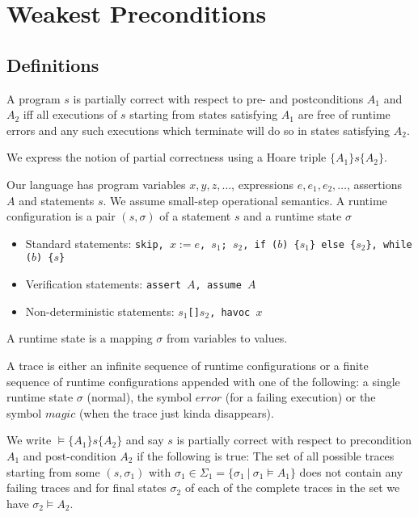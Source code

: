 \section{Weakest Preconditions}
\subsection{Definitions}
\begin{mytitle} A program $s$ is partially correct with respect to pre- and postconditions $A_1$ and $A_2$ iff all executions of $s$ starting from states satisfying $A_1$ are free of runtime errors and any such executions which terminate will do so in states satisfying $A_2$.
\end{mytitle}
\begin{mytitle} We express the notion of partial correctness using a Hoare triple $\{A_1\}s\{A_2\}$.
\end{mytitle}
\begin{mytitle} Our language has program variables $x, y, z, \ldots$, expressions $e, e_1, e_2, \ldots$, assertions $A$ and statements $s$. We assume small-step operational semantics. A runtime configuration is a pair $(s, \sigma)$ of a statement $s$ and a runtime state $\sigma$
    \begin{mysubtitle}[Statements] \hfill
    \begin{itemize}
        \item Standard statements: \texttt{skip, $x:=e$, $s_1$; $s_2$, if ($b$) \{$s_1$\} else \{$s_2$\}, while ($b$) \{$s$\}}
        \item Verification statements: \texttt{assert $A$, assume $A$}
        \item Non-deterministic statements: \texttt{$s_1$[]$s_2$, havoc $x$}
    \end{itemize}
    \end{mysubtitle}
    \begin{mysubtitle} A runtime state is a mapping $\sigma$ from variables to values.
    \end{mysubtitle}
    \begin{mysubtitle}[Trace] A trace is either an infinite sequence of runtime configurations or a finite sequence of runtime configurations appended with one of the following: a single runtime state $\sigma$ (normal), the symbol $error$ (for a failing execution) or the symbol $magic$ (when the trace just kinda disappears).
    \end{mysubtitle}
\end{mytitle}
\begin{mytitle} We write $\models \{A_1\}s\{A_2\}$ and say $s$ is partially correct with respect to precondition $A_1$ and post-condition $A_2$ if the following is true: The set of all possible traces starting from some $(s, \sigma_1)$ with $\sigma_1\in \Sigma_1=\{\sigma_1\ |\ \sigma_1\models A_1\}$ does not contain any failing traces and for final states $\sigma_2$ of each of the complete traces in the set we have $\sigma_2\models A_2$.
\end{mytitle}

